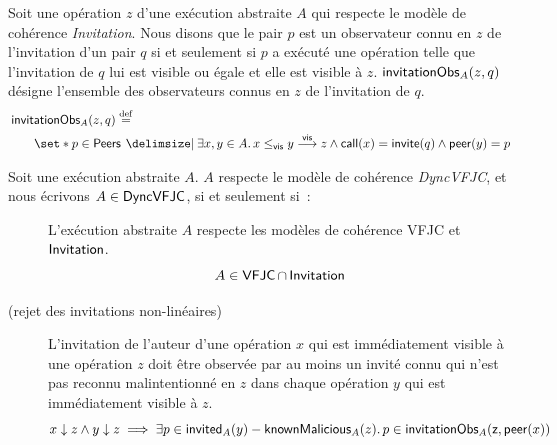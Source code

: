 \begin{definition}\label{def:invitation-obs}
Soit une opération $z$ d'une exécution abstraite $A$ qui respecte le modèle de cohérence \emph{Invitation}.
Nous disons que le pair $p$ est un observateur connu en $z$ de l'invitation d'un pair $q$ si et seulement si $p$ a exécuté une opération telle que l'invitation de $q$ lui est visible ou égale et elle est visible à $z$.
$\operatorname{\mathsf{invitationObs}}_A(z, q)$ désigne l'ensemble des observateurs connus en $z$ de l'invitation de $q$.
\begin{equation*}\begin{split}
    \MoveEqLeft\trm{invitationObs}_A(z, q) \defeq\\
    &\set*{p \in \trm{Peers} \given \exists x, y \in A \qsep x \viseq y \vis z \land \trm{call}(x) = \trm{invite}(q) \land \trm{peer}(y) = p}
\end{split}\end{equation*}
\end{definition}

\begin{definition}\label{def:svfjc-consistency}
Soit une exécution abstraite $A$. $A$ respecte le modèle de cohérence \emph{DyncVFJC}, et nous écrivons $A \in \operatorname{\mathsf{DyncVFJC}}$, si et seulement si~:
\begin{description}
  \item[]
  L'exécution abstraite $A$ respecte les modèles de cohérence \acs{VFJC} et $\operatorname{\mathsf{Invitation}}$.
  \begin{equation*}
    A \in \operatorname{\mathsf{VFJC}} \cap \operatorname{\mathsf{Invitation}}
  \end{equation*}
  
  \item[ (rejet des invitations non-linéaires)]
  L'invitation de l'auteur d'une opération $x$ qui est immédiatement visible à une opération $z$ doit être observée par au moins un invité connu qui n'est pas reconnu malintentionné en $z$ dans chaque opération $y$ qui est immédiatement visible à $z$.
  \begin{equation*}
      x \downarrow z \land y \downarrow z \implies \exists p \in \operatorname{\mathsf{invited}}_A(y) - \operatorname{\mathsf{knownMalicious}}_A(z) \ldotp p \in \operatorname{\mathsf{invitationObs}}_A(\operatorname{\mathsf{z, peer}}(x))
  \end{equation*}
  \end{description}
\end{definition}

